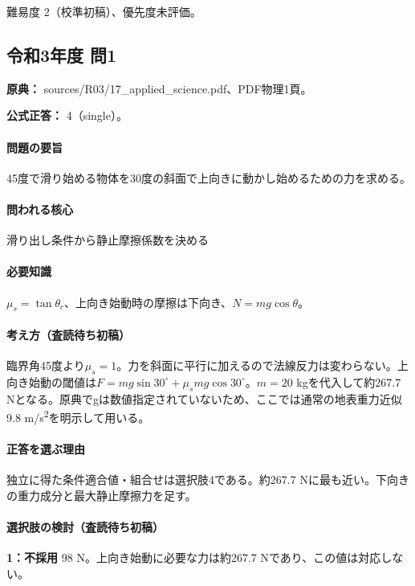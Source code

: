 \par 難易度 2（校準初稿）、優先度未評価。

\subsection{令和3年度 問1}
\label{q:r03-reg-applied-01}

\noindent\textbf{原典：} sources/R03/17\_applied\_science.pdf、PDF物理1頁。

\textbf{公式正答：} 4（single）。

\paragraph{問題の要旨} 45度で滑り始める物体を30度の斜面で上向きに動かし始めるための力を求める。

\paragraph{問われる核心} 滑り出し条件から静止摩擦係数を決める

\paragraph{必要知識} \(\mu_s=\tan\theta_c\)、上向き始動時の摩擦は下向き、\(N=mg\cos\theta\)。

\paragraph{考え方（査読待ち初稿）} 臨界角45度より\(\mu_s=1\)。力を斜面に平行に加えるので法線反力は変わらない。上向き始動の閾値は\(F=mg\sin30^\circ+\mu_smg\cos30^\circ\)。\(m=20\) kgを代入して約267.7 Nとなる。原典でgは数値指定されていないため、ここでは通常の地表重力近似9.8 m/s\textsuperscript{2}を明示して用いる。

\paragraph{正答を選ぶ理由} 独立に得た条件適合値・組合せは選択肢4である。約267.7 Nに最も近い。下向きの重力成分と最大静止摩擦力を足す。

\paragraph{選択肢の検討（査読待ち初稿）}\mbox{}\par

\noindent\textbf{1：不採用} 98 N。上向き始動に必要な力は約267.7 Nであり、この値は対応しない。\par

